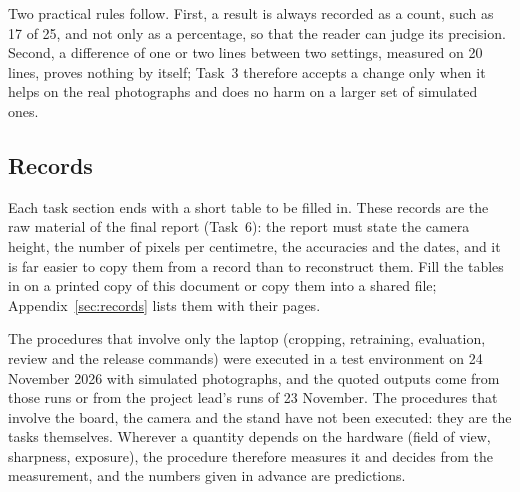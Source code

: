 Two practical rules follow. First, a result is always recorded as a count, such as 17 of 25,
and not only as a percentage, so that the reader can judge its precision. Second, a difference
of one or two lines between two settings, measured on 20 lines, proves nothing by itself;
Task~3 therefore accepts a change only when it helps on the real photographs and does no harm
on a larger set of simulated ones.

\subsection{Records}

Each task section ends with a short table to be filled in. These records are the raw material of
the final report (Task~6): the report must state the camera height, the number of pixels per
centimetre, the accuracies and the dates, and it is far easier to copy them from a record than
to reconstruct them. Fill the tables in on a printed copy of this document or copy them into a
shared file; Appendix~\ref{sec:records} lists them with their pages.

\begin{note}
The procedures that involve only the laptop (cropping, retraining, evaluation, review and the
release commands) were executed in a test environment on 24 November 2026 with simulated
photographs, and the quoted outputs come from those runs or from the project lead's runs of 23
November. The procedures that involve the board, the camera and the stand have not been
executed: they are the tasks themselves. Wherever a quantity depends on the hardware (field of
view, sharpness, exposure), the procedure therefore measures it and decides from the
measurement, and the numbers given in advance are predictions.
\end{note}

